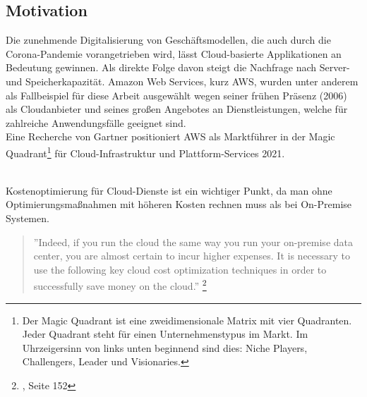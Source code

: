 \subsection{Motivation}
Die zunehmende Digitalisierung von Geschäftsmodellen, die auch durch die Corona-Pandemie vorangetrieben wird{\cite{STA3}}, lässt Cloud-basierte Applikationen an Bedeutung gewinnen{\cite{STA2}}. Als direkte Folge davon steigt die Nachfrage nach Server- und Speicherkapazität.
Amazon Web Services, kurz AWS, wurden unter anderem als Fallbeispiel für diese Arbeit ausgewählt wegen seiner frühen Präsenz (2006) als Cloudanbieter und seines großen Angebotes an Dienstleistungen, welche für zahlreiche Anwendungsfälle geeignet sind.
\\
Eine Recherche von Gartner positioniert AWS als Marktführer in der Magic Quadrant\footnote{Der Magic Quadrant ist eine zweidimensionale Matrix mit vier Quadranten. Jeder Quadrant steht für einen Unternehmenstypus im Markt. Im Uhrzeigersinn von links unten beginnend sind dies: Niche Players, Challengers, Leader und Visionaries.} für Cloud-Infrastruktur und Plattform-Services 2021{\cite{G01}}.
\\\\
\begin{comment} GELÖSCHT, WEIL DIESE EINE BEHAUPTUNG IST (25.10.2021)
\\\\
Für viele Unternehmen ist eine große Herausforderung, die Kosten von Cloud-Diensten übersichtlich zu halten und Optimierungsmöglichkeit leicht zu erkennen. Zusätzlich besteht die Gefahr, unangenehme Überraschungen in einer Rechnung zu bekommen, weil keine Grenze für den Konsum von Cloud-Diensten festgelegt wurde. 
\end{comment}
Kostenoptimierung für Cloud-Dienste ist ein wichtiger Punkt, da man ohne Optimierungsmaßnahmen mit höheren Kosten rechnen muss als bei On-Premise Systemen.
\\
\begin{quote}
    ”Indeed, if you run the cloud the same way you run your on-premise data center, you are almost certain to incur higher expenses. It is necessary to use the following key cloud cost optimization techniques in order to successfully save money on the cloud.”
    \footnote{{\cite{CCB}}, Seite 152}
\end{quote}

